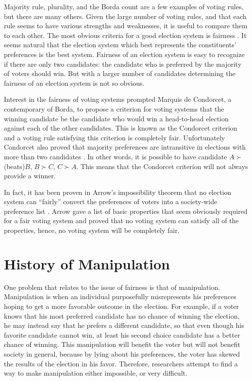 	Majority rule, plurality, and the Borda count are a few examples of voting rules, but there are many others. Given the large number of voting rules, and that each rule seems to have various strengths and weaknesses, it is useful to compare them to each other. The most obvious criteria for a good election system is fairness \cite{chevaleyre2006issues}. It seems natural that the election system which best represents the constituents' preferences is the best system. Fairness of an election system is easy to recognize if there are only two candidates: the candidate who is preferred by the majority of voters should win. But with a larger number of candidates determining the fairness of an election system is not so obvious.

	Interest in the fairness of voting systems prompted Marquis de Condorcet, a contemporary of Borda, to propose a criterion for voting systems that the winning candidate be the candidate who would win a head-to-head election against each of the other candidates. This is known as the Condorcet criterion and a voting rule satisfying this criterion is completely fair. Unfortunately Condorcet also proved that majority preferences are intransitive in elections with more than two candidates \cite{le1785essai, black1998theory}. In other words, it is possible to have candidate $A \succ $(beats)$ B$, $B \succ C$, $C \succ A$. This means that the Condorcet criterion will not always provide a winner.

	In fact, it has been proven in Arrow's impossibility theorem that no election system can ``fairly'' convert the preferences of voters into a society-wide preference list \cite{arrow1950difficulty}. Arrow gave a list of basic properties that seem obviously required for a fair voting system and proved that no voting system can satisfy all of the properties, hence, no voting system will be completely fair.


\section{History of Manipulation}

	One problem that relates to the issue of fairness is that of manipulation. Manipulation is when an individual purposefully misrepresents his preferences hoping to get a more favorable outcome in the election. For example, if a voter knows that his most preferred candidate has no chance of winning the election, he may instead say that he prefers a different candidate, so that even though his favorite candidate cannot win, at least his second choice candidate has a better chance of winning. This manipulation will benefit the voter but will not benefit society in general, because by lying about his preferences, the voter has skewed the results of the election in his favor. Therefore, researchers attempt to find a way to make manipulation either impossible, or very difficult.

